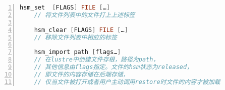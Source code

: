\begin{lstlisting}[language={c++},numbers=left]
    hsm_set  [FLAGS] FILE […] 
    // 将文件列表中的文件打上上述标签
    
    hsm_clear [FLAGS] FILE […] 
    // 移除文件列表中相应的标签

    hsm_import path [flags…] 
    // 在lustre中创建文件存根，路径为path，
    // 其他信息由flags指定。文件的hsm状态为released，
    // 即文件的内容存储在后端存储，
    // 仅当文件被打开或者用户主动调用restore时文件的内容才被加载

\end{lstlisting}
 